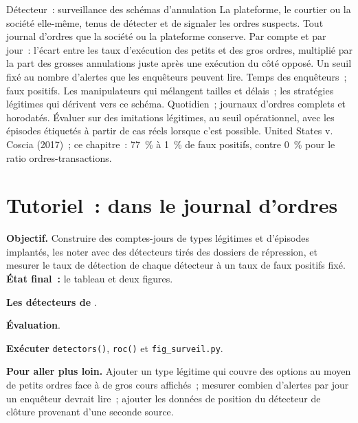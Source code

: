 \begin{strategyfile}{Détecteur~: surveillance des schémas d'annulation}\label{strat:s2:manipulative-strategies-and-how-they-are-caught:detector}
 La plateforme, le courtier ou la société elle-même, tenus de détecter et de signaler les ordres suspects.
 Tout journal d'ordres que la société ou la plateforme conserve.
 Par compte et par jour~: l'écart entre les taux d'exécution des petits et des gros ordres, multiplié par la part des grosses annulations juste après une exécution du
côté opposé.
 Un seuil fixé au nombre d'alertes que les enquêteurs peuvent lire.
 Temps des enquêteurs~; faux positifs.
 Les manipulateurs qui mélangent tailles et délais~; les stratégies légitimes qui dérivent vers ce schéma.
 Quotidien~; journaux d'ordres complets et horodatés.
 Évaluer sur des imitations légitimes, au seuil opérationnel, avec les épisodes étiquetés à partir de cas réels lorsque c'est possible.
 United States v. Coscia (2017)~; ce chapitre~: 77~\% à 1~\% de faux positifs, contre 0~\% pour le ratio ordres-transactions.
\end{strategyfile}

\section{Tutoriel~: dans le journal d'ordres}\label{tut:s2:manipulative-strategies-and-how-they-are-caught:tut}

\begin{tutorial}
\textbf{Objectif.} Construire des comptes-jours de types légitimes et d'épisodes implantés, les noter avec des détecteurs tirés des dossiers de répression, et mesurer
le taux de détection de chaque détecteur à un taux de faux positifs fixé. \textbf{État final~:} le tableau et deux figures.
\begin{tutsteps}
\item \textbf{Les détecteurs de }.
\label{lst:s2:manipulative-strategies-and-how-they-are-caught:detect}
\item \textbf{Évaluation}.
\label{lst:s2:manipulative-strategies-and-how-they-are-caught:eval}
\item \textbf{Exécuter} \texttt{detectors()}, \texttt{roc()} et \texttt{fig\_surveil.py}.
\end{tutsteps}
\textbf{Pour aller plus loin.} Ajouter un type légitime qui couvre des options au moyen de petits ordres face à de gros cours affichés~; mesurer combien d'alertes par jour un
enquêteur devrait lire~; ajouter les données de position du détecteur de clôture provenant d'une seconde source.
\end{tutorial}

